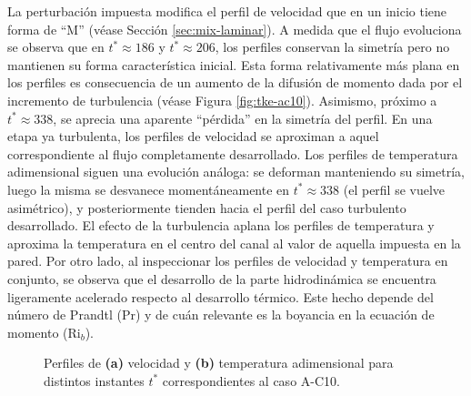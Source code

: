 La perturbación impuesta modifica el perfil de velocidad que en un inicio tiene forma de ``M'' (véase Sección \ref{sec:mix-laminar}). A medida que el flujo evoluciona se observa que en $t^* \approx 186$ y $t^* \approx 206$, los perfiles conservan la simetría pero no mantienen su forma característica inicial. Esta forma relativamente más plana en los perfiles es consecuencia de un aumento de la difusión de momento dada por el incremento de turbulencia (véase Figura \ref{fig:tke-ac10}). Asimismo, próximo a $t^* \approx 338$, se aprecia una aparente ``pérdida'' en la simetría del perfil. En una etapa ya turbulenta, los perfiles de velocidad se aproximan a aquel correspondiente al flujo completamente desarrollado. Los perfiles de temperatura adimensional siguen una evolución análoga: se deforman manteniendo su simetría, luego la misma se desvanece momentáneamente en $t^* \approx 338$ (el perfil se vuelve asimétrico), y posteriormente tienden hacia el perfil del caso turbulento desarrollado. El efecto de la turbulencia aplana los perfiles de temperatura y aproxima la temperatura en el centro del canal al valor de aquella impuesta en la pared. Por otro lado, al inspeccionar los perfiles de velocidad y temperatura en conjunto, se observa que el desarrollo de la parte hidrodinámica se encuentra ligeramente acelerado respecto al desarrollo térmico. Este hecho depende del número de Prandtl (Pr) y de cuán relevante es la boyancia en la ecuación de momento (Ri$_b$).


\begin{figure}[H]
  \centering  
  
  \caption{Perfiles de \textbf{(a)} velocidad y \textbf{(b)} temperatura adimensional para distintos instantes $t^*$ correspondientes al caso A-C10.}
  \label{fig:mosaico-ac10}
\end{figure} 

